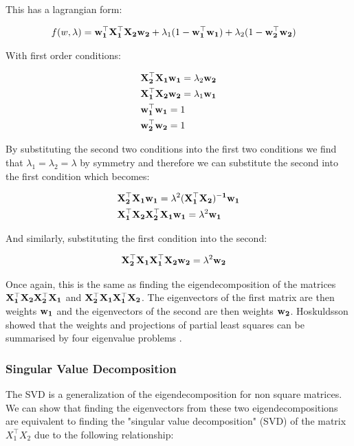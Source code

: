 This has a lagrangian form:

\begin{align}
     & f(w,\lambda)=\bold{w_1^{\top}X_1^{\top}X_2w_2} + \lambda_1(1-\bold{w_1^{\top}w_1}) + \lambda_2(1-\bold{w_2^{\top}w_2})
\end{align}

With first order conditions:

\begin{align}
     & \bold{X_2^{\top}X_1w_1}=\lambda_2\bold{w_2} \\
     & \bold{X_1^{\top}X_2w_2}=\lambda_1\bold{w_1} \\
     & \bold{w_1^{\top}w_1}=1                      \\
     & \bold{w_2^{\top}w_2}=1
\end{align}

By substituting the second two conditions into the first two conditions we find that $\lambda_1=\lambda_2=\lambda$ by symmetry and therefore we can substitute the second into the first condition which becomes:

\begin{align}
     & \bold{X_2^{\top}X_1w_1}=\lambda^2\bold{(X_1^{\top}X_2)^{-1}w_1} \\
     & \bold{X_1^{\top}X_2X_2^{\top}X_1w_1}=\lambda^2\bold{w_1}
\end{align}

And similarly, substituting the first condition into the second:

\begin{align}
     & \bold{X_2^{\top}X_1X_1^{\top}X_2w_2}=\lambda^2\bold{w_2}
\end{align}

Once again, this is the same as finding the eigendecomposition of the matrices $\bold{X_1^{\top}X_2X_2^{\top}X_1}$ and $\bold{X_2^{\top}X_1X_1^{\top}X_2}$. The eigenvectors of the first matrix are then weights $\bold{w_1}$ and the eigenvectors of the second are then weights $\bold{w_2}$. Hoskuldsson showed that the weights and projections of partial least squares can be summarised by four eigenvalue problems \cite{hoskuldsson1988pls}.

\subsubsection{Singular Value Decomposition}

The SVD is a generalization of the eigendecomposition for non square matrices. We can show that finding the eigenvectors from these two eigendecompositions are equivalent to finding the "singular value decomposition" (SVD) of the matrix $X_1^{\top}X_2$ due to the following relationship:

